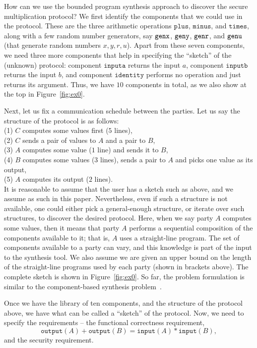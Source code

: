 \documentclass[preprint]{sig-alternate-05-2015}
\begin{document}
How can we use the bounded program synthesis approach to discover the
secure multiplication protocol?
We first identify the components that we could use in the protocol.
These are the three arithmetic operations 
$\mathtt{plus}$, 
$\mathtt{minus}$, and $\mathtt{times}$, along with
a few random number generators, say 
$\mbox{${\mathtt{genx}}$}$,
$\mbox{${\mathtt{geny}}$}$,
$\mbox{${\mathtt{genr}}$}$, and
$\mbox{${\mathtt{genu}}$}$ (that generate random numbers $x,y,r,u$).
Apart from these seven components, we need three more components that help
in specifying the ``sketch'' of the (unknown) protocol:
component $\mathtt{inputa}$ returns the input $a$,
component $\mathtt{inputb}$ returns the input $b$,
and
component $\mathtt{identity}$ performs no operation and just returns
its argument. Thus, we have $10$ components in total, as we also
show at the top in Figure~\ref{fig:ex0}.

Next, let us fix a communication schedule between the parties.
Let us say the structure of the protocol is as follows:\\
(1) $C$ computes some values first ($5$ lines), \\
(2) $C$ sends a pair of values to $A$ and a pair to $B$,\\
(3) $A$ computes some value ($1$ line) and sends it to $B$,\\
(4) $B$ computes some values ($3$ lines), 
sends a pair to $A$ and picks one value as its output, \\
(5) $A$ computes its output ($2$ lines).\\
It is reasonable to assume that the user has a sketch such as above,
and we assume as such in this paper.
Nevertheless, even if such a structure is not available, one could either
pick a general-enough structure, or
iterate over such structures, to discover the desired protocol.
Here, when we say party $A$ computes some values, then
it means that party $A$ performs a 
sequential composition of the components available to it; that is,
$A$ uses a straight-line program.
The set of components available to a party can vary, and this knowledge
is part of the input to the synthesis tool.  
We also assume we are given an upper
bound on the length of the straight-line programs
used by each party (shown in brackets above).   
The complete sketch is shown in Figure~\ref{fig:ex0}.
So far, the problem formulation
is similar to the component-based synthesis problem~\cite{bitvector}.

Once we have the library of ten components, and the structure of the protocol
above, we have what can be called a ``sketch'' of the protocol.  Now, we need
to specify the requirements -- the functional correctness requirement,
$$\mathtt{output}(A) + \mathtt{output}(B) = \mathtt{input}(A)*\mathtt{input}(B),$$
and the security requirement.
\end{document}
